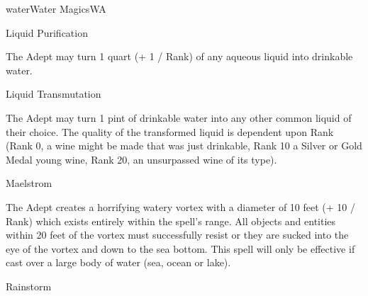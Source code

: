 \begin{College}[1.3]{water}{Water Magics}{WA}
\begin{spell}[S-5]{Liquid Purification}

\begin{effects}
The Adept may turn 1 quart (+ 1 / Rank) of any aqueous liquid into
drinkable water.
\end{effects}
\end{spell}

\begin{spell}[S-6]{Liquid Transmutation}

\begin{effects}
The Adept may turn 1 pint of drinkable water into any other common
liquid of their choice.  The quality of the transformed liquid is
dependent upon Rank (Rank 0, a wine might be made that was just
drinkable, Rank 10 a Silver or Gold Medal young wine, Rank 20, an
unsurpassed wine of its type).
\end{effects}
\end{spell}

\begin{spell}[S-7]{Maelstrom}

\begin{effects}
The Adept creates a horrifying watery vortex with a diameter of 10
feet (+ 10 / Rank) which exists entirely within the spell’s range.
All objects and entities within 20 feet of the vortex must
successfully resist or they are sucked into the eye of the vortex and
down to the sea bottom. This spell will only be effective if cast over
a large body of water (sea, ocean or lake).
\end{effects}
\end{spell}

\begin{spell}[S-8]{Rainstorm}


\end{spell}
\end{College}
